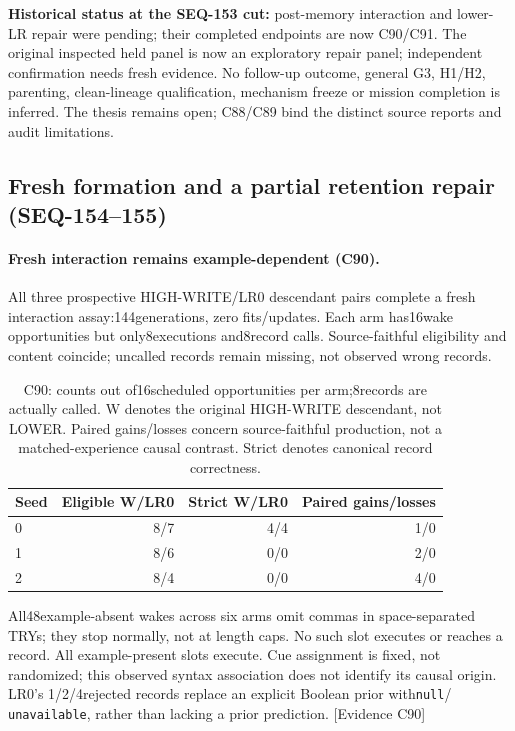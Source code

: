 \documentclass[11pt]{article}
\newcommand{\ev}[1]{\textsf{[Evidence #1]}}
\begin{document}
\noindent\textbf{Historical status at the SEQ-153 cut:} post-memory interaction
and lower-LR repair were pending; their completed endpoints are now C90/C91. The original inspected held panel is now an
exploratory repair panel; independent confirmation needs fresh evidence. No
follow-up outcome, general G3, H1/H2, parenting, clean-lineage qualification,
mechanism freeze or mission completion is inferred. The thesis remains open;
C88/C89 bind the distinct source reports and audit limitations.

\subsection{Fresh formation and a partial retention repair (SEQ-154--155)}
\label{sec:seq155-extension}
\paragraph{Fresh interaction remains example-dependent (C90).}
All three prospective HIGH-WRITE/LR0 descendant pairs complete a fresh
interaction assay:144generations, zero fits/updates. Each arm has16wake
opportunities but only8executions and8record calls. Source-faithful eligibility
and content coincide; uncalled records remain missing, not observed wrong records.
\begin{table}[htbp]
\centering\small
\begin{tabular}{lrrr}
\toprule
Seed & Eligible W/LR0 & Strict W/LR0 & Paired gains/losses \\
\midrule
0 & 8/7 & 4/4 & 1/0 \\
1 & 8/6 & 0/0 & 2/0 \\
2 & 8/4 & 0/0 & 4/0 \\
\bottomrule
\end{tabular}
\caption{C90: counts out of16scheduled opportunities per arm;8records are
actually called. W denotes the original HIGH-WRITE descendant, not LOWER.
Paired gains/losses concern source-faithful production, not a matched-experience
causal contrast. Strict denotes canonical record correctness.}
\label{tab:seq154-formation}
\end{table}
All48example-absent wakes across six arms omit commas in space-separated TRYs;
they stop normally, not at length caps. No such slot executes or reaches a record.
All example-present slots execute. Cue assignment is fixed, not randomized;
this observed syntax association does not identify its causal origin. LR0's
1/2/4rejected records replace an explicit Boolean prior with\texttt{null}/
\texttt{unavailable}, rather than lacking a prior prediction. \ev{C90}
\end{document}
